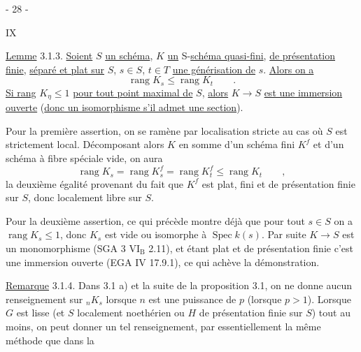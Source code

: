 \begin{center}- 28 -\end{center}\hfill IX

\uline{Lemme} 3.1.3. \uline{Soient} $S$ \uline{un schéma}, $K$ \uline{un} S-\uline{schéma quasi-fini}, \uline{de présentation finie}, \uline{séparé et plat sur} $S$, $s\in S$, $t\in T$ \uline{une générisation de} $s$.
\uline{Alors on a}
\[
 \operatorname{rang}K_s\leq\operatorname{rang}K_t\qquad.
\]
\uline{Si rang} $K_\eta\leq1$ \uline{pour tout point maximal de} $S$, \uline{alors}
$K\longrightarrow S$ \uline{est une immersion ouverte} (\uline{donc un isomorphisme s'il admet une section}).

Pour la première assertion, on se ramène par localisation
stricte au cas où $S$ est strictement local. Décomposant alors $K$ en
somme d'un schéma fini $K^f$ et d'un schéma à fibre spéciale vide, on
aura
\[
 \operatorname{rang}K_s=\operatorname{rang}K_s^f=\operatorname{rang}K_t^f
 \leq\operatorname{rang}K_t\qquad,
\]
la deuxième égalité provenant du fait que $K^f$ est plat, fini et de
présentation finie sur $S$, donc localement libre sur $S$.

Pour la deuxième assertion, ce qui précède montre déjà que
pour tout $s\in S$ on a $\operatorname{rang}K_s\leq1$, donc $K_s$ est vide ou isomorphe à
$\operatorname{Spec}k(s)$. Par suite $K\longrightarrow S$ est un monomorphisme (SGA 3 $\mathrm{VI_B}$ 2.11),
et étant plat et de présentation finie c'est une immersion ouverte
(EGA IV 17.9.1), ce qui achève la démonstration.

\uline{Remarque} 3.1.4. Dans 3.1 a) et la suite de la proposition 3.1, on ne
donne aucun renseignement sur ${}_nK_s$ lorsque $n$ est une puissance de $p$
(lorsque $p>1$). Lorsque $G$ est lisse (et $S$ localement noethérien ou
$H$ de présentation finie sur $S$) tout au moins, on peut donner un tel
renseignement, par essentiellement la même méthode que dans la
